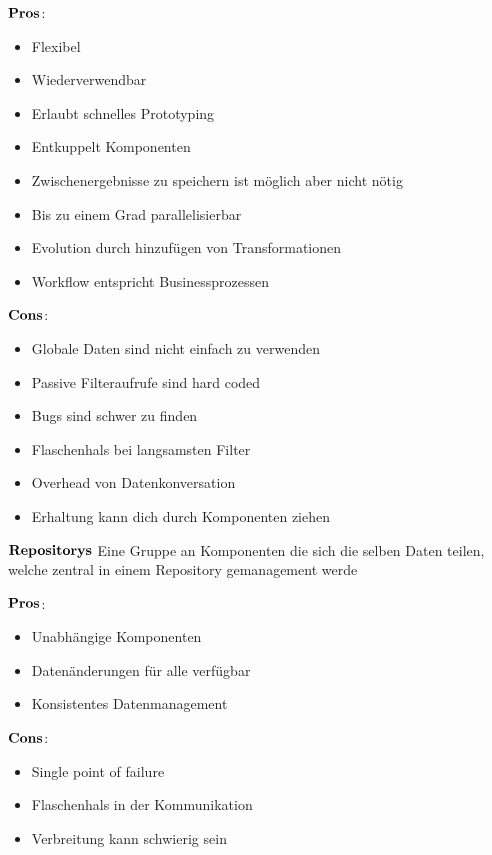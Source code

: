 \begin{multicols}{2}
$\bold{Pros}$:
\begin{itemize}
	\item Flexibel
	\item Wiederverwendbar
	\item Erlaubt schnelles Prototyping
	\item Entkuppelt Komponenten
	\item Zwischenergebnisse zu speichern ist möglich aber nicht nötig
	\item Bis zu einem Grad parallelisierbar
	\item Evolution durch hinzufügen von Transformationen
	\item Workflow entspricht Businessprozessen 
\end{itemize}
\columnbreak
$\bold{Cons}$:
\begin{itemize}
	\item Globale Daten sind nicht einfach zu verwenden
	\item Passive Filteraufrufe sind hard coded
	\item Bugs sind schwer zu finden
	\item Flaschenhals bei langsamsten Filter
	\item Overhead von Datenkonversation
	\item Erhaltung kann dich durch Komponenten ziehen
\end{itemize}
\end{multicols}
$\bold{Repositorys}$
Eine Gruppe an Komponenten die sich die selben Daten teilen, welche zentral in einem Repository gemanagement werde
\begin{multicols}{2}
$\bold{Pros}$:
\begin{itemize}
	\item Unabhängige Komponenten
	\item Datenänderungen für alle verfügbar
	\item Konsistentes Datenmanagement
\end{itemize}
\columnbreak
$\bold{Cons}$:
\begin{itemize}
	\item Single point of failure
	\item Flaschenhals in der Kommunikation
	\item Verbreitung kann schwierig sein
\end{itemize}
\end{multicols}
